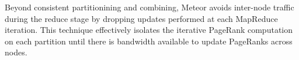 Beyond consistent partitionining and combining, Meteor avoids inter-node traffic during the reduce stage by dropping updates performed at each MapReduce iteration. This technique effectively isolates the iterative PageRank computation on each partition until there is bandwidth available to update PageRanks across nodes. 

%

